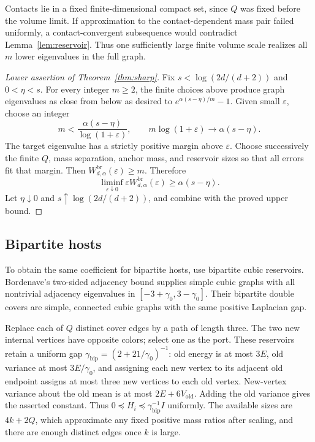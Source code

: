 \documentclass[11pt]{article}
\begin{document}
Contacts lie in a fixed finite-dimensional compact set, since $Q$ was
fixed before the volume limit. If approximation to the contact-dependent
mass pair failed uniformly, a contact-convergent subsequence would
contradict Lemma~\ref{lem:reservoir}. Thus one sufficiently large finite
volume scale realizes all $m$ lower eigenvalues in the full graph.

\begin{proof}[Lower assertion of Theorem~\ref{thm:sharp}]
Fix $s<\log(2d/(d+2))$ and $0<\eta<s$. For every integer $m\ge2$, the finite
choices above produce graph eigenvalues as close from below as desired
to $e^{\alpha(s-\eta)/m}-1$. Given small $\varepsilon$, choose an integer
\[
 m<\frac{\alpha(s-\eta)}{\log(1+\varepsilon)},\qquad
 m\log(1+\varepsilon)\longrightarrow\alpha(s-\eta).
\]
The target eigenvalue has a strictly positive margin above
$\varepsilon$. Choose successively the finite $Q$, mass separation,
anchor mass, and reservoir sizes so that all errors fit that margin.
Then $W^{\mathrm{br}}_{d,\alpha}(\varepsilon)\ge m$. Therefore
\[
 \liminf_{\varepsilon\downarrow0}\varepsilon
            W^{\mathrm{br}}_{d,\alpha}(\varepsilon)
                         \ge\alpha(s-\eta).
\]
Let $\eta\downarrow0$ and $s\uparrow\log(2d/(d+2))$, and combine with the
proved upper bound.
\end{proof}

\subsection{Bipartite hosts}
To obtain the same coefficient for bipartite hosts, use bipartite
cubic reservoirs. Bordenave's two-sided adjacency bound supplies
simple cubic graphs with all nontrivial adjacency eigenvalues in
$[-3+\gamma_0,3-\gamma_0]$. Their bipartite double covers are simple,
connected cubic graphs with the same positive Laplacian gap.

Replace each of $Q$ distinct cover edges by a path of length three.
The two new internal vertices have opposite colors; select one as the
port. These reservoirs retain a uniform gap
$\gamma_{\mathrm{bip}}=(2+21/\gamma_0)^{-1}$: old energy is at most
$3E$, old variance at most $3E/\gamma_0$, and assigning each new
vertex to its adjacent old endpoint assigns at most three new vertices
to each old vertex. New-vertex variance about the old mean is at most
$2E+6V_{\mathrm{old}}$. Adding the old variance gives the asserted
constant. Thus $0\preceq H_i\preceq\gamma_{\mathrm{bip}}^{-1}I$
uniformly. The available sizes are $4k+2Q$, which approximate any
fixed positive mass ratios after scaling, and there are enough distinct
edges once $k$ is large.
\end{document}
